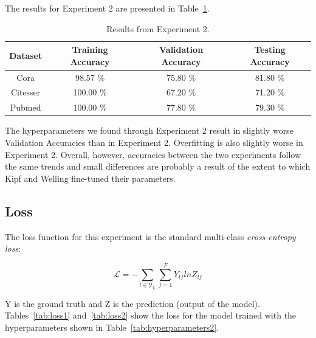 The results for Experiment 2 are presented in Table~\ref{tab:results2}.

\begin {table}[ht!]
  \begin{center}
    \begin{tabular}{|c|c|c|c|}
    \hline
    Dataset    &  Training Accuracy & Validation Accuracy & Testing Accuracy\\ \hline
    Cora          & 98.57 \% & 75.80 \%  & 81.80 \% \\ 
    Citesser      & 100.00 \%& 67.20 \%  & 71.20 \% \\
    Pubmed        & 100.00 \%& 77.80 \%  & 79.30 \% \\
    \hline
    \end{tabular}
  \end{center}
\caption {Results from Experiment 2.} \label{tab:results2} 
\end{table}

The hyperparameters we found through Experiment 2 result in slightly worse Validation Accuracies than in Experiment 2. Overfitting is also slightly worse in Experiment 2. Overall, however, accuracies between the two experiments follow the same trends and small differences are probably a result of the extent to which Kipf and Welling fine-tuned their parameters. 

\subsection{Loss}

The loss function for this experiment is the standard multi-class \textit{cross-entropy loss}:

\begin{equation}
  \label{loss}
  \mathcal{L} = - \sum_{l \in \mathcal{Y}_{L}} \sum_{f=1}^{F} Y_{lf}lnZ_{lf}  
\end{equation}

Y is the ground truth and Z is the prediction (output of the model). Tables~\ref{tab:loss1} and~\ref{tab:loss2} show the loss for the model trained with the hyperparameters shown in Table~\ref{tab:hyperparameters2}.


